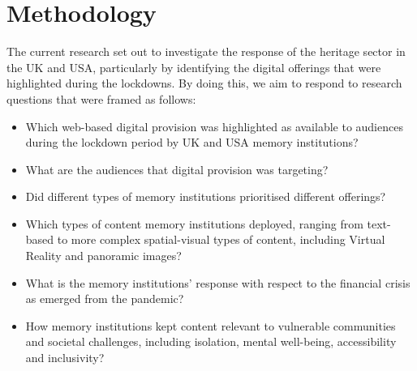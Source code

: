 \documentclass{egpubl}
\begin{document}
\section{Methodology}
\label{meth}


The current research set out to investigate the response of the heritage sector in the UK and USA, particularly by identifying the digital offerings that were highlighted during the lockdowns. By doing this, we aim to respond to research questions that were framed as follows:

\begin{itemize}
\item Which web-based digital provision was highlighted as available to audiences during the lockdown period by UK and USA memory institutions? 
\item What are the audiences that digital provision was targeting?
\item Did different types of memory institutions prioritised different offerings?
\item Which types of content memory institutions deployed, ranging from text-based to more complex spatial-visual types of content, including Virtual Reality and panoramic images?
\item What is the memory institutions' response with respect to the financial crisis as emerged from the pandemic?
\item How memory institutions kept content relevant to vulnerable communities and societal challenges, including isolation, mental well-being, accessibility and inclusivity?
\end{itemize}
\end{document}
